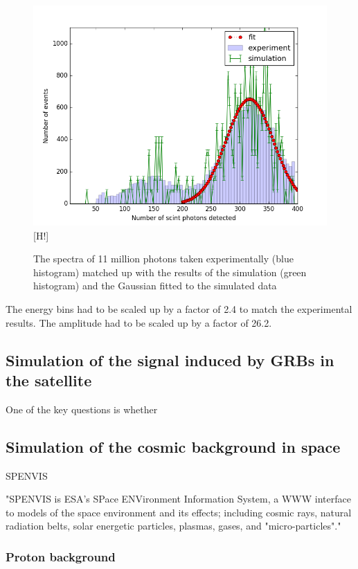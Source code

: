 \documentclass[12pt, a4paper,titlepage]{article}
\numberwithin{equation}{section}
\numberwithin{figure}{section}
\begin{document}
\begin{figure}[h!]
\includegraphics[width=150.0mm]{images/calibration_photon_yield.png}[H!]
\caption{The spectra of 11 million photons taken experimentally (blue histogram) matched up with the results of the simulation (green histogram) and the Gaussian fitted to the simulated data}
\end{figure}

The energy bins had to be scaled up by a factor of 2.4 to match the experimental results. The amplitude had to be scaled up by a factor of 26.2.

\pagebreak

\subsection{Simulation of the signal induced by GRBs in the satellite}

One of the key questions is whether 




\subsection{Simulation of the cosmic background in space}

SPENVIS \cite{spenvis}

"SPENVIS is ESA's SPace ENVironment Information System, a WWW interface to models of the space environment and its effects; including cosmic rays, natural radiation belts, solar energetic particles, plasmas, gases, and "micro-particles"."

\subsubsection{Proton background}
\end{document}
